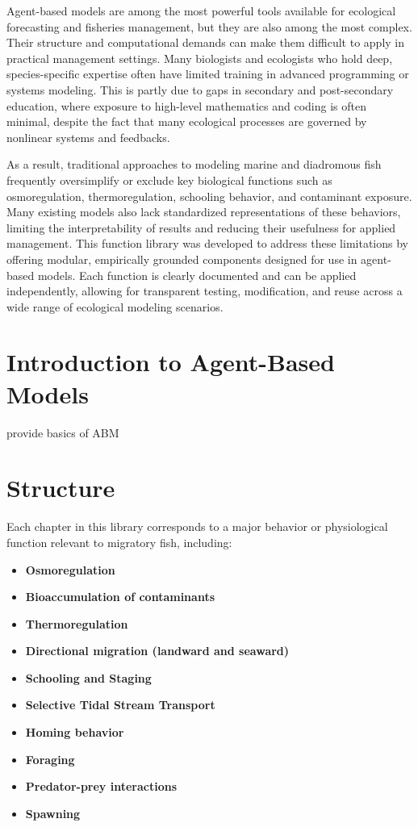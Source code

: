 \documentclass[
]{book}
\begin{document}
Agent-based models are among the most powerful tools available for ecological forecasting and fisheries management, but they are also among the most complex. Their structure and computational demands can make them difficult to apply in practical management settings. Many biologists and ecologists who hold deep, species-specific expertise often have limited training in advanced programming or systems modeling. This is partly due to gaps in secondary and post-secondary education, where exposure to high-level mathematics and coding is often minimal, despite the fact that many ecological processes are governed by nonlinear systems and feedbacks.

As a result, traditional approaches to modeling marine and diadromous fish frequently oversimplify or exclude key biological functions such as osmoregulation, thermoregulation, schooling behavior, and contaminant exposure. Many existing models also lack standardized representations of these behaviors, limiting the interpretability of results and reducing their usefulness for applied management. This function library was developed to address these limitations by offering modular, empirically grounded components designed for use in agent-based models. Each function is clearly documented and can be applied independently, allowing for transparent testing, modification, and reuse across a wide range of ecological modeling scenarios.

\section{Introduction to Agent-Based Models}\label{introduction-to-agent-based-models}

provide basics of ABM

\section{Structure}\label{structure}

Each chapter in this library corresponds to a major behavior or physiological function relevant to migratory fish, including:

\begin{itemize}
\item
  \textbf{Osmoregulation}
\item
  \textbf{Bioaccumulation of contaminants}
\item
  \textbf{Thermoregulation}
\item
  \textbf{Directional migration (landward and seaward)}
\item
  \textbf{Schooling and Staging}
\item
  \textbf{Selective Tidal Stream Transport}
\item
  \textbf{Homing behavior}
\item
  \textbf{Foraging}
\item
  \textbf{Predator-prey interactions}
\item
  \textbf{Spawning}
\end{itemize}
\end{document}
